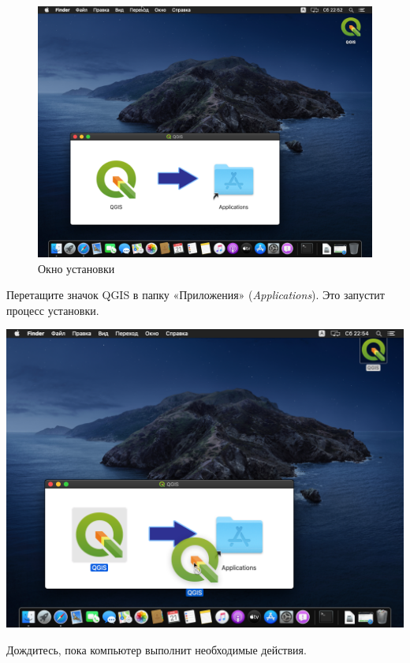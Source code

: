 \documentclass[
  12pt,
]{book}
\begin{document}
\begin{figure}
\centering
\includegraphics{images/Index0/mac04.png}
\caption{Окно установки}
\end{figure}

Перетащите значок QGIS в папку «Приложения» (\emph{Applications}). Это запустит процесс установки.

\includegraphics{images/Index0/mac05.png}

Дождитесь, пока компьютер выполнит необходимые действия.
\end{document}
